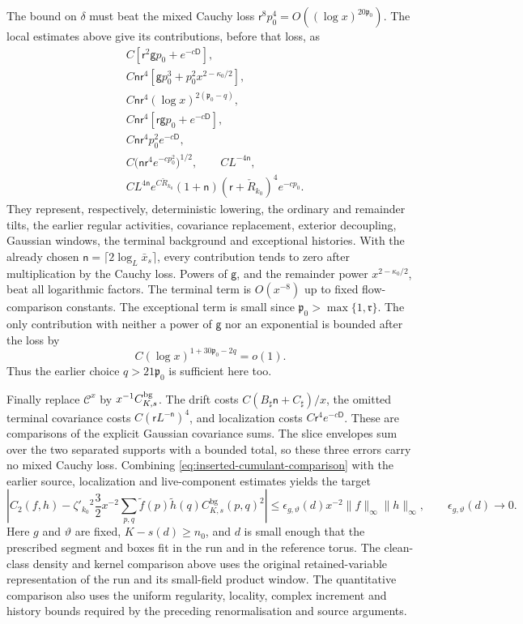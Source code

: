 \documentclass[11pt,letterpaper,reqno]{amsart}
\theoremstyle{definition}
\theoremstyle{remark}
\begin{document}
The bound on $\delta$ must beat the mixed Cauchy loss
$\mathsf r^8p_0^4=O((\log x)^{20\mathfrak p_0})$.
The local estimates above give its contributions, before that loss,
as
\begin{align*}
 &C[\mathsf r^2\mathsf g p_0+e^{-c\mathsf D}],\\
 &C\mathsf n\mathsf r^4
       [\mathsf g p_0^3+p_0^2x^{2-\kappa_0/2}],\\
 &C\mathsf n\mathsf r^4(\log x)^{2(\mathfrak p_0-q)},\\
 &C\mathsf n\mathsf r^4
       [\mathsf r\mathsf g p_0+e^{-c\mathsf D}],\\
 &C\mathsf n\mathsf r^4p_0^2e^{-c\mathsf D},\\
 &C\big(\mathsf n\mathsf r^4e^{-cp_0^2}\big)^{1/2},
       \qquad CL^{-4\mathsf n},\\
 &C L^{4\mathsf n}e^{C\check R_{k_0}}(1+\mathsf n)
       (\mathsf r+\check R_{k_0})^4e^{-cp_0}.
\end{align*}
They represent, respectively, deterministic lowering, the ordinary
and remainder tilts, the earlier regular activities, covariance
replacement, exterior decoupling, Gaussian windows, the terminal
background and exceptional histories. With the already chosen
$\mathsf n=\lceil2\log_L\bar x_s\rceil$, every contribution tends
to zero after multiplication by the Cauchy loss. Powers of
$\mathsf g$, and the remainder power $x^{2-\kappa_0/2}$, beat all
logarithmic factors. The terminal term is
$O(x^{-8})$ up to fixed flow-comparison constants. The exceptional
term is small since $\mathfrak p_0>\max\{1,\mathfrak r\}$.
The only contribution with neither a power of $\mathsf g$ nor an
exponential is bounded after the loss by
\[
 C(\log x)^{1+30\mathfrak p_0-2q}=o(1).
\]
Thus the earlier choice $q>21\mathfrak p_0$ is sufficient here too.

Finally replace $\mathcal C^x$ by
$x^{-1}C_{K,s}^{\rm bg}$. The drift costs
$C(B_\sharp\mathsf n+C_\sharp)/x$, the omitted terminal covariance
costs $C(\mathsf rL^{-\mathsf n})^4$, and localization costs
$C\mathsf r^4e^{-c\mathsf D}$. These are comparisons of the explicit
Gaussian covariance sums. The slice envelopes sum over the two
separated supports with a bounded total, so these three errors
carry no mixed Cauchy loss. Combining
\eqref{eq:inserted-cumulant-comparison} with the earlier source,
localization and live-component estimates yields the target
\[
 \left|C_2(f,h)-\zeta'_{k_0}{}^2\frac32x^{-2}
       \sum_{p,q}\tilde f(p)\tilde h(q)
                          C_{K,s}^{\mathrm{bg}}(p,q)^2\right|
 \le\epsilon_{g,\vartheta}(d)x^{-2}
                         \|f\|_\infty\|h\|_\infty,
 \qquad\epsilon_{g,\vartheta}(d)\longrightarrow0.
\]
Here $g$ and $\vartheta$ are fixed, $K-s(d)\ge n_0$, and $d$ is
small enough that the prescribed segment and boxes fit in the run
and in the reference torus. The clean-class density and kernel
comparison above uses the original retained-variable representation
of the run and its small-field product window. The quantitative
comparison also uses the uniform regularity, locality, complex
increment and history bounds required by the preceding
renormalisation and source arguments.
\end{document}
